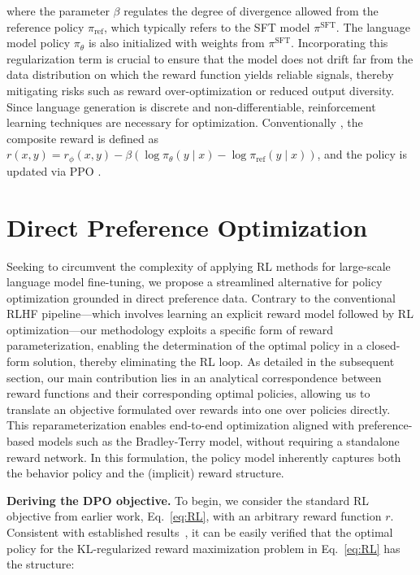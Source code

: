 where the parameter $\beta$ regulates the degree of divergence allowed from the reference policy $\pi_\text{ref}$, which typically refers to the SFT model $\pi^\text{SFT}$. The language model policy $\pi_\theta$ is also initialized with weights from $\pi^\text{SFT}$. Incorporating this regularization term is crucial to ensure that the model does not drift far from the data distribution on which the reward function yields reliable signals, thereby mitigating risks such as reward over-optimization or reduced output diversity. Since language generation is discrete and non-differentiable, reinforcement learning techniques are necessary for optimization. Conventionally \citep{ziegler2020finetuning, stiennon2022learning, bai2022training, ouyang2022training}, the composite reward is defined as $r(x, y) = r_{\phi}(x, y) - \beta (\log \pi_{\theta}(y\mid x) - \log \pi_\text{ref}(y\mid x))$, and the policy is updated via PPO \cite{schulman2017proximal}.

\section{Direct Preference Optimization}\label{sec:DPO}

Seeking to circumvent the complexity of applying RL methods for large-scale language model fine-tuning, we propose a streamlined alternative for policy optimization grounded in direct preference data. Contrary to the conventional RLHF pipeline—which involves learning an explicit reward model followed by RL optimization—our methodology exploits a specific form of reward parameterization, enabling the determination of the optimal policy in a closed-form solution, thereby eliminating the RL loop. As detailed in the subsequent section, our main contribution lies in an analytical correspondence between reward functions and their corresponding optimal policies, allowing us to translate an objective formulated over rewards into one over policies directly. This reparameterization enables end-to-end optimization aligned with preference-based models such as the Bradley-Terry model, without requiring a standalone reward network. In this formulation, the policy model inherently captures both the behavior policy and the (implicit) reward structure.

\textbf{Deriving the DPO objective.} To begin, we consider the standard RL objective from earlier work, Eq.~\ref{eq:RL}, with an arbitrary reward function $r$. Consistent with established results~\citep{peters2007reinforcement, peng2019advantage, korbak2022reinforcement, go2023aligning}, it can be easily verified that the optimal policy for the KL-regularized reward maximization problem in Eq.~\ref{eq:RL} has the structure:


